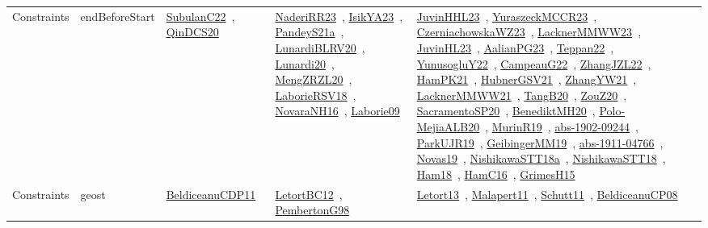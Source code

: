 {\begin{longtable}{lp{3cm}>{\raggedright\arraybackslash}p{6cm}>{\raggedright\arraybackslash}p{6cm}>{\raggedright\arraybackslash}p{8cm}}
Constraints & endBeforeStart & \href{works/SubulanC22.pdf}{SubulanC22}~\cite{SubulanC22}, \href{works/QinDCS20.pdf}{QinDCS20}~\cite{QinDCS20} & \href{works/NaderiRR23.pdf}{NaderiRR23}~\cite{NaderiRR23}, \href{works/IsikYA23.pdf}{IsikYA23}~\cite{IsikYA23}, \href{works/PandeyS21a.pdf}{PandeyS21a}~\cite{PandeyS21a}, \href{works/LunardiBLRV20.pdf}{LunardiBLRV20}~\cite{LunardiBLRV20}, \href{works/Lunardi20.pdf}{Lunardi20}~\cite{Lunardi20}, \href{works/MengZRZL20.pdf}{MengZRZL20}~\cite{MengZRZL20}, \href{works/LaborieRSV18.pdf}{LaborieRSV18}~\cite{LaborieRSV18}, \href{works/NovaraNH16.pdf}{NovaraNH16}~\cite{NovaraNH16}, \href{works/Laborie09.pdf}{Laborie09}~\cite{Laborie09} & \href{works/JuvinHHL23.pdf}{JuvinHHL23}~\cite{JuvinHHL23}, \href{works/YuraszeckMCCR23.pdf}{YuraszeckMCCR23}~\cite{YuraszeckMCCR23}, \href{works/CzerniachowskaWZ23.pdf}{CzerniachowskaWZ23}~\cite{CzerniachowskaWZ23}, \href{works/LacknerMMWW23.pdf}{LacknerMMWW23}~\cite{LacknerMMWW23}, \href{works/JuvinHL23.pdf}{JuvinHL23}~\cite{JuvinHL23}, \href{works/AalianPG23.pdf}{AalianPG23}~\cite{AalianPG23}, \href{works/Teppan22.pdf}{Teppan22}~\cite{Teppan22}, \href{works/YunusogluY22.pdf}{YunusogluY22}~\cite{YunusogluY22}, \href{works/CampeauG22.pdf}{CampeauG22}~\cite{CampeauG22}, \href{works/ZhangJZL22.pdf}{ZhangJZL22}~\cite{ZhangJZL22}, \href{works/HamPK21.pdf}{HamPK21}~\cite{HamPK21}, \href{works/HubnerGSV21.pdf}{HubnerGSV21}~\cite{HubnerGSV21}, \href{works/ZhangYW21.pdf}{ZhangYW21}~\cite{ZhangYW21}, \href{works/LacknerMMWW21.pdf}{LacknerMMWW21}~\cite{LacknerMMWW21}, \href{works/TangB20.pdf}{TangB20}~\cite{TangB20}, \href{works/ZouZ20.pdf}{ZouZ20}~\cite{ZouZ20}, \href{works/SacramentoSP20.pdf}{SacramentoSP20}~\cite{SacramentoSP20}, \href{works/BenediktMH20.pdf}{BenediktMH20}~\cite{BenediktMH20}, \href{works/Polo-MejiaALB20.pdf}{Polo-MejiaALB20}~\cite{Polo-MejiaALB20}, \href{works/MurinR19.pdf}{MurinR19}~\cite{MurinR19}, \href{works/abs-1902-09244.pdf}{abs-1902-09244}~\cite{abs-1902-09244}, \href{works/ParkUJR19.pdf}{ParkUJR19}~\cite{ParkUJR19}, \href{works/GeibingerMM19.pdf}{GeibingerMM19}~\cite{GeibingerMM19}, \href{works/abs-1911-04766.pdf}{abs-1911-04766}~\cite{abs-1911-04766}, \href{works/Novas19.pdf}{Novas19}~\cite{Novas19}, \href{works/NishikawaSTT18a.pdf}{NishikawaSTT18a}~\cite{NishikawaSTT18a}, \href{works/NishikawaSTT18.pdf}{NishikawaSTT18}~\cite{NishikawaSTT18}, \href{works/Ham18.pdf}{Ham18}~\cite{Ham18}, \href{works/HamC16.pdf}{HamC16}~\cite{HamC16}, \href{works/GrimesH15.pdf}{GrimesH15}~\cite{GrimesH15}\\
Constraints & geost & \href{works/BeldiceanuCDP11.pdf}{BeldiceanuCDP11}~\cite{BeldiceanuCDP11} & \href{works/LetortBC12.pdf}{LetortBC12}~\cite{LetortBC12}, \href{works/PembertonG98.pdf}{PembertonG98}~\cite{PembertonG98} & \href{works/Letort13.pdf}{Letort13}~\cite{Letort13}, \href{works/Malapert11.pdf}{Malapert11}~\cite{Malapert11}, \href{works/Schutt11.pdf}{Schutt11}~\cite{Schutt11}, \href{works/BeldiceanuCP08.pdf}{BeldiceanuCP08}~\cite{BeldiceanuCP08}\\

\end{longtable}}
